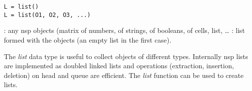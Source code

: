 
\begin{mandesc}
\end{mandesc}

\begin{calling_sequence}
\begin{verbatim}
L = list()
L = list(O1, O2, O3, ...)
\end{verbatim}
\end{calling_sequence}
\begin{parameters}
  \begin{varlist}
    :  any nsp objects (matrix of numbers, of
    strings, of booleans, of cells, list, \ldots
    : list formed with the objects (an empty list in the
    first case).
  \end{varlist}
\end{parameters}

\begin{mandescription}
The \emph{list} data type is useful to collect objects of different
types. Internally nsp lists are implemented as doubled linked lists
and operations (extraction, insertion, deletion) on head and queue
are efficient. The \emph{list} function can be used to create lists.  
\end{mandescription}

